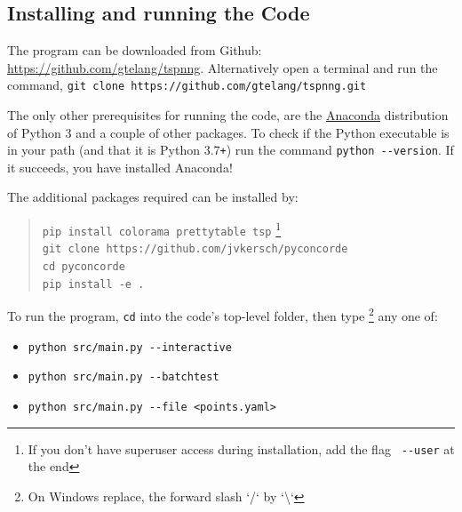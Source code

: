 \begin{appendices}

\newpage
\section{Installing and running the Code}
\label{sec:install}

The program can be downloaded from Github: \url{https://github.com/gtelang/tspnng}. Alternatively
open a terminal and run the command, \texttt{git clone https://github.com/gtelang/tspnng.git}

The only other prerequisites for running the code, are the 
\href{https://www.anaconda.com/products/individual}{Anaconda} distribution of Python 3 
and a couple of other packages.  To check if the Python executable is in your path (and that it is Python 3.7\texttt{+}) 
run the command \verb|python --version|. If it succeeds, you have installed Anaconda! 

The additional packages required can be installed by: 

\begin{quote}
\color{blue}
\texttt{pip install colorama prettytable tsp} \footnote{If you don't have superuser access during installation, add the flag \texttt{\color{red} \texttt{-{}-}user} at the end}   \\
\texttt{git clone https://github.com/jvkersch/pyconcorde} \\
\texttt{cd pyconcorde}\\
\texttt{pip install -e .}
\end{quote}


To run the program, \texttt{cd} into the code's top-level folder, then type \footnote{On Windows replace, the forward slash `/` by `\textbackslash`}
any one of: 

\begin{itemize}
\item \verb|python src/main.py --interactive|
\item \verb|python src/main.py --batchtest|
\item \verb|python src/main.py --file <points.yaml>|
\end{itemize}




\end{appendices}
